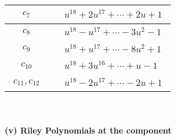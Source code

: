 \documentclass[1p]{elsarticle_modified}
\theoremstyle{definition}
\begin{document}
\begin{tabular}{m{50pt}|m{274pt}}
\hline $$\begin{aligned}c_{7}\end{aligned}$$&$\begin{aligned}
&u^{18}+2 u^{17}+\cdots+2 u+1
\end{aligned}$\\
\hline $$\begin{aligned}c_{8}\end{aligned}$$&$\begin{aligned}
&u^{18}- u^{17}+\cdots-3 u^2-1
\end{aligned}$\\
\hline $$\begin{aligned}c_{9}\end{aligned}$$&$\begin{aligned}
&u^{18}+u^{17}+\cdots-8 u^2+1
\end{aligned}$\\
\hline $$\begin{aligned}c_{10}\end{aligned}$$&$\begin{aligned}
&u^{18}+3 u^{16}+\cdots+u-1
\end{aligned}$\\
\hline $$\begin{aligned}c_{11},c_{12}\end{aligned}$$&$\begin{aligned}
&u^{18}-2 u^{17}+\cdots-2 u+1
\end{aligned}$\\
\hline
\end{tabular}\\~\\
\newpage\renewcommand{\arraystretch}{1}
\flushleft \textbf{(v) Riley Polynomials at the component}\newline \\
\end{document}
